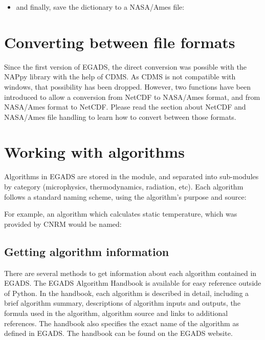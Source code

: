 \documentclass[a4paper,10pt,openany,english]{sphinxmanual}
\begin{document}
\begin{itemize}
\item {} 
and finally, save the dictionary to a NASA/Ames file:

\begin{sphinxVerbatim}[commandchars=\\\{\}]
 
\end{sphinxVerbatim}

\end{itemize}


\section{Converting between file formats}
\label{tutorial:converting-between-file-formats}
Since the first version of EGADS, the direct conversion was possible with the NAPpy library with the help of CDMS. As CDMS is not compatible with windows, that possibility has been dropped. However, two functions have been introduced to allow a conversion from NetCDF to NASA/Ames format, and from NASA/Ames format to NetCDF. Please read the section about NetCDF and NASA/Ames file handling to learn how to convert between those formats.
\newpage

\section{Working with algorithms}
\label{tutorial:working-with-algorithms}
Algorithms in EGADS are stored in the  module, and separated into sub-modules by category (microphysics, thermodynamics, radiation, etc). Each algorithm follows a standard naming scheme, using the algorithm's purpose and source:


For example, an algorithm which calculates static temperature, which was provided by CNRM would be named:



\subsection{Getting algorithm information}
\label{tutorial:getting-algorithm-information}
There are several methods to get information about each algorithm contained in EGADS. The EGADS Algorithm Handbook is available for easy reference outside of Python. In the handbook, each algorithm is described in detail, including a brief algorithm summary, descriptions of algorithm inputs and outputs, the formula used in the algorithm, algorithm source and links to additional references. The handbook also specifies the exact name of the algorithm as defined in EGADS. The handbook can be found on the EGADS website.
\end{document}
